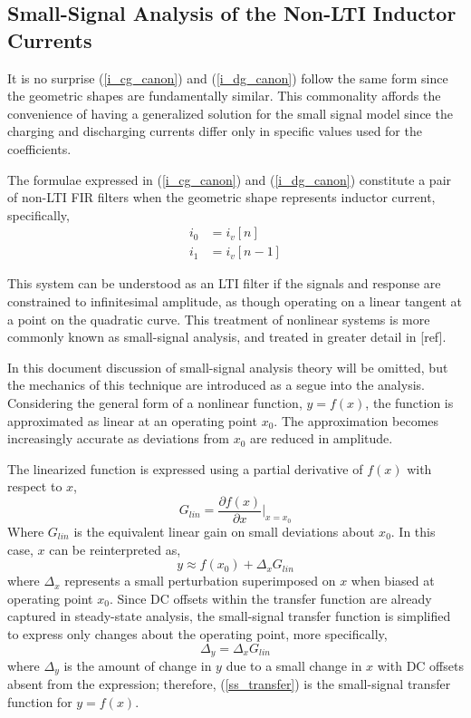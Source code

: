 \documentclass[conference]{IEEEtran}
\begin{document}
\subsection{Small-Signal Analysis of the Non-LTI Inductor Currents}
It is no surprise (\ref{i_cg_canon}) and (\ref{i_dg_canon}) follow the same form since the geometric shapes are fundamentally similar. This commonality affords the convenience of having a generalized solution for the small signal model since the charging and discharging currents differ only in specific values used for the coefficients.

The formulae expressed in (\ref{i_cg_canon}) and (\ref{i_dg_canon}) constitute a pair of non-LTI FIR filters when the geometric shape represents inductor current, specifically,
\begin{align}
i_0 &= i_v[n] \nonumber \\
i_1 &= i_v[n-1]
\label{i0i1ivn}
\end{align}

This system can be understood as an LTI filter if the signals and response are constrained to infinitesimal amplitude, as though operating on a linear tangent at a point on the quadratic curve. This treatment of nonlinear systems is more commonly known as small-signal analysis, and treated in greater detail in [ref].

In this document discussion of small-signal analysis theory will be omitted, but the mechanics of this technique are introduced as a segue into the analysis.  Considering the general form of a nonlinear function, $y = f(x)$, the function is approximated as linear at an operating point $x_0$.  The approximation becomes increasingly accurate as deviations from $x_0$ are reduced in amplitude.

The linearized function is expressed using a partial derivative of $f(x)$ with respect to $x$,
\begin{equation}
	G_{lin} = \frac{\partial f(x)}{\partial x}\bigg|_{x=x_0}
\end{equation}
Where $G_{lin}$ is the equivalent linear gain on small deviations about $x_0$. In this case, $x$ can be reinterpreted as,
\begin{equation}
y \approx f(x_0) + \Delta_x G_{lin}
\end{equation}
where $\Delta_x$ represents a small perturbation superimposed on $x$ when biased at operating point $x_0$.  Since DC offsets within the transfer function are already captured in steady-state analysis, the small-signal transfer function is simplified to express only changes about the operating point, more specifically,
 \begin{equation}
 \Delta_y = \Delta_x G_{lin} \label{ss_transfer}
 \end{equation}
where $\Delta_y$ is the amount of change in $y$ due to a small change in $x$ with DC offsets absent from the expression; therefore, (\ref{ss_transfer}) is the small-signal transfer function for $y=f(x)$.
\end{document}
